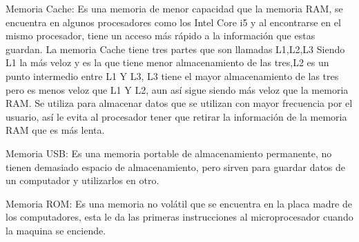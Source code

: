 \documentclass{article}
\begin{document}
Memoria Cache: Es una memoria de menor capacidad que la memoria RAM, se encuentra en algunos procesadores como los Intel Core i5 y al encontrarse en el mismo procesador, tiene un acceso más rápido a la información que estas guardan. La memoria Cache tiene tres partes que son llamadas L1,L2,L3 Siendo L1 la más veloz y es la que tiene menor almacenamiento de las tres,L2 es un punto intermedio entre L1 Y L3, L3 tiene el mayor almacenamiento de las tres pero es menos veloz que L1 Y L2, aun así sigue siendo más veloz que la memoria RAM. Se utiliza para almacenar datos que se utilizan con mayor frecuencia por el usuario, así le evita al procesador tener que retirar la información de la memoria RAM que es más lenta.

Memoria USB: Es una memoria portable de almacenamiento permanente, no tienen demasiado espacio de almacenamiento, pero sirven para guardar datos de un computador y utilizarlos en otro.

Memoria ROM: Es una memoria no volátil que se encuentra en la placa madre de los computadores, esta le da las primeras instrucciones al microprocesador cuando la maquina se enciende.
\end{document}
